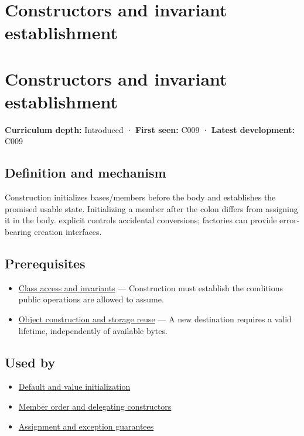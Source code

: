 \hypertarget{appendix-7f8ec83d0886}{}
\section*{Constructors and invariant establishment}
\section{Constructors and invariant establishment}\label{constructors-and-invariant-establishment}

\textbf{Curriculum depth:} Introduced · \textbf{First seen:} C009 · \textbf{Latest development:} C009

\subsection{Definition and mechanism}\label{definition-and-mechanism}

Construction initializes bases/members before the body and establishes the promised usable state. Initializing a member after the colon differs from assigning it in the body. explicit controls accidental conversions; factories can provide error-bearing creation interfaces.

\subsection{Prerequisites}\label{prerequisites}

\begin{itemize}
\tightlist
\item
  \hyperref[appendix-8e5214819615]{Class access and invariants} --- Construction must establish the conditions public operations are allowed to assume.
\item
  \hyperref[appendix-a82f9c438857]{Object construction and storage reuse} --- A new destination requires a valid lifetime, independently of available bytes.
\end{itemize}

\subsection{Used by}\label{used-by}

\begin{itemize}
\tightlist
\item
  \hyperref[appendix-ba8c1a9fe03f]{Default and value initialization}
\item
  \hyperref[appendix-3cb49709605a]{Member order and delegating constructors}
\item
  \hyperref[appendix-bea6beb5350f]{Assignment and exception guarantees}
\end{itemize}

